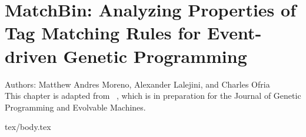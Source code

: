 \chapter{MatchBin: Analyzing Properties of Tag Matching Rules for Event-driven Genetic Programming}
\label{ch:tag-matching}

\noindent
Authors: Matthew Andres Moreno, Alexander Lalejini, and Charles Ofria \\
This chapter is adapted from ~\citep{moreno2021matchmaker}, which is in preparation for the Journal of Genetic Programming and Evolvable Machines.

{tex/body.tex}
